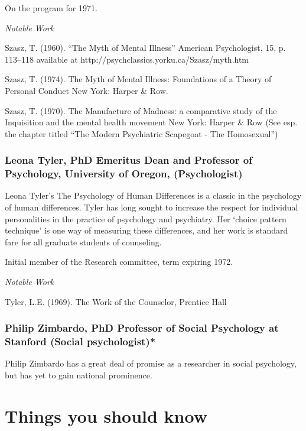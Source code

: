 \begin{refsection}
On the program for 1971.

\emph{Notable Work}

Szasz, T. (1960). “The Myth of Mental Illness” American Psychologist, 15, p. 113--118 available at http:\slash \slash psychclassics.yorku.ca\slash Szasz\slash myth.htm

Szasz, T. (1974). The Myth of Mental Illness: Foundations of a Theory of Personal Conduct New York: Harper \& Row.

Szasz, T. (1970). The Manufacture of Madness: a comparative study of the Inquisition and the mental health movement New York: Harper \& Row (See esp. the chapter titled “The Modern Psychiatric Scapegoat - The Homosexual”)

\subsubsection{Leona Tyler, PhD Emeritus Dean and Professor of Psychology, University of Oregon, (Psychologist)}
\label{leonatylerphdemeritusdeanandprofessorofpsychologyuniversityoforegonpsychologist}

Leona Tyler's The Psychology of Human Differences is a classic in the psychology of human differences. Tyler has long sought to increase the respect for individual personalities in the practice of psychology and psychiatry. Her `choice pattern technique' is one way of measuring these differences, and her work is standard fare for all graduate students of counseling.

Initial member of the Research committee, term expiring 1972.

\emph{Notable Work}

Tyler, L.E. (1969). The Work of the Counselor, Prentice Hall

\subsubsection{Philip Zimbardo, PhD Professor of Social Psychology at Stanford (Social psychologist)*}
\label{philipzimbardophdprofessorofsocialpsychologyatstanfordsocialpsychologist}

Philip Zimbardo has a great deal of promise as a researcher in social psychology, but has yet to gain national prominence.

\section{Things you should know}
\label{thingsyoushouldknow}


\end{refsection}
